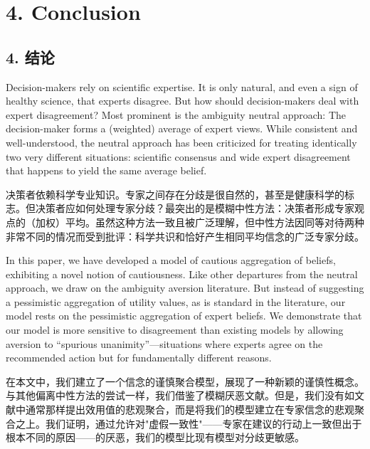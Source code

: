 \documentclass[12pt,a4paper]{article}
\newenvironment{original}
  {\par\noindent\ignorespaces}
  {\par}
\newenvironment{translation}
  {\par\noindent{\color{transblue}\ignorespaces}}
  {\par\medskip}
\begin{document}
\newpage
\section{4. Conclusion}
{\color{transblue}\subsection*{4. 结论}}

\begin{original}
Decision-makers rely on scientific expertise. It is only natural, and even a sign of healthy science, that experts disagree. But how should decision-makers deal with expert disagreement? Most prominent is the ambiguity neutral approach: The decision-maker forms a (weighted) average of expert views. While consistent and well-understood, the neutral approach has been criticized for treating identically two very different situations: scientific consensus and wide expert disagreement that happens to yield the same average belief.
\end{original}

\begin{translation}
决策者依赖科学专业知识。专家之间存在分歧是很自然的，甚至是健康科学的标志。但决策者应如何处理专家分歧？最突出的是模糊中性方法：决策者形成专家观点的（加权）平均。虽然这种方法一致且被广泛理解，但中性方法因同等对待两种非常不同的情况而受到批评：科学共识和恰好产生相同平均信念的广泛专家分歧。
\end{translation}

\begin{original}
In this paper, we have developed a model of cautious aggregation of beliefs, exhibiting a novel notion of cautiousness. Like other departures from the neutral approach, we draw on the ambiguity aversion literature. But instead of suggesting a pessimistic aggregation of utility values, as is standard in the literature, our model rests on the pessimistic aggregation of expert beliefs. We demonstrate that our model is more sensitive to disagreement than existing models by allowing aversion to ``spurious unanimity''---situations where experts agree on the recommended action but for fundamentally different reasons.
\end{original}

\begin{translation}
在本文中，我们建立了一个信念的谨慎聚合模型，展现了一种新颖的谨慎性概念。与其他偏离中性方法的尝试一样，我们借鉴了模糊厌恶文献。但是，我们没有如文献中通常那样提出效用值的悲观聚合，而是将我们的模型建立在专家信念的悲观聚合之上。我们证明，通过允许对"虚假一致性"——专家在建议的行动上一致但出于根本不同的原因——的厌恶，我们的模型比现有模型对分歧更敏感。
\end{translation}
\end{document}
